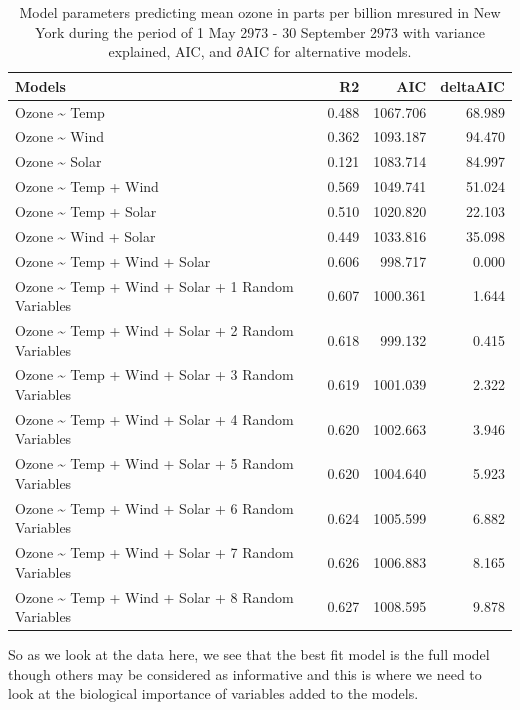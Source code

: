 \documentclass[
  letterpaper,
]{book}
\begin{document}
\begin{longtable}[t]{lrrr}
\caption{\label{tab:unnamed-chunk-33}Model parameters predicting mean ozone in parts per billion mresured in New York during the period of 1 May 2973 - 30 September 2973 with variance explained, AIC, and ∂AIC for alternative models.}\\
\toprule
Models & R2 & AIC & deltaAIC\\
\midrule
Ozone \textasciitilde{} Temp & 0.488 & 1067.706 & 68.989\\
Ozone \textasciitilde{} Wind & 0.362 & 1093.187 & 94.470\\
Ozone \textasciitilde{} Solar & 0.121 & 1083.714 & 84.997\\
Ozone \textasciitilde{} Temp + Wind & 0.569 & 1049.741 & 51.024\\
Ozone \textasciitilde{} Temp + Solar & 0.510 & 1020.820 & 22.103\\
\addlinespace
Ozone \textasciitilde{} Wind + Solar & 0.449 & 1033.816 & 35.098\\
Ozone \textasciitilde{} Temp + Wind + Solar & 0.606 & 998.717 & 0.000\\
Ozone \textasciitilde{} Temp + Wind + Solar + 1 Random Variables & 0.607 & 1000.361 & 1.644\\
Ozone \textasciitilde{} Temp + Wind + Solar + 2 Random Variables & 0.618 & 999.132 & 0.415\\
Ozone \textasciitilde{} Temp + Wind + Solar + 3 Random Variables & 0.619 & 1001.039 & 2.322\\
\addlinespace
Ozone \textasciitilde{} Temp + Wind + Solar + 4 Random Variables & 0.620 & 1002.663 & 3.946\\
Ozone \textasciitilde{} Temp + Wind + Solar + 5 Random Variables & 0.620 & 1004.640 & 5.923\\
Ozone \textasciitilde{} Temp + Wind + Solar + 6 Random Variables & 0.624 & 1005.599 & 6.882\\
Ozone \textasciitilde{} Temp + Wind + Solar + 7 Random Variables & 0.626 & 1006.883 & 8.165\\
Ozone \textasciitilde{} Temp + Wind + Solar + 8 Random Variables & 0.627 & 1008.595 & 9.878\\
\bottomrule
\end{longtable}

So as we look at the data here, we see that the best fit model is the
full model though others may be considered as informative and this is
where we need to look at the biological importance of variables added to
the models.
\end{document}
